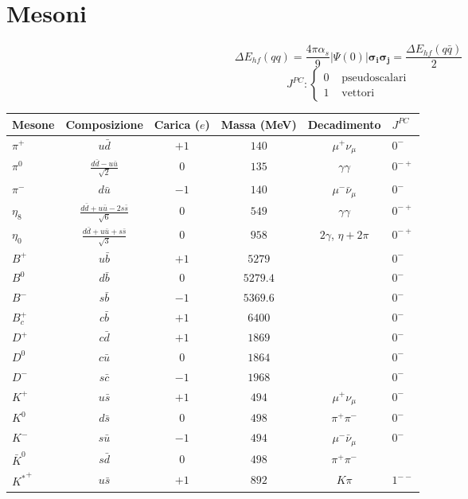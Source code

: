 \documentclass[10pt, onecolumn, a4paper]{article}
\def\bb{\mathbf}
\def\({\left(}
\def\){\right)}
\begin{document}
\section{Mesoni} %
$$\Delta E_{hf}\(qq\)=\frac{4\pi\alpha_s}{9}\left|\Psi\(0\)\right|\bb{\sigma_i}\bb{\sigma_j}=\frac{\Delta E_{hf}\(q\bar q\)}{2}$$
$$J^{PC}:\begin{cases} 0 & \textrm{ pseudoscalari} \\
1 & {\textrm{ vettori}}\end{cases}$$
\begin{center}\begin{tabularx}{\textwidth}{l | c c c c | l}
\toprule
Mesone & Composizione & Carica ($e$) & Massa (\si{MeV}) & Decadimento & $J^{PC}$ \\
\midrule
$\pi^+$ & $u\bar d$ & $+1$ & $140$ & $\mu^+\nu_\mu$ & $0^{-}$ \\
$\pi^0$ & $\frac{d\bar d-u\bar u}{\sqrt{2}}$ & $0$ & $135$ & $\gamma\gamma$ & $0^{-+}$ \\
$\pi^-$ & $d\bar u$ & $-1$ & $140$ & $\mu^-\bar\nu_\mu$ & $0^{-}$ \\
\midrule
$\eta_8$ & $\frac{d\bar d+u\bar u-2s\bar s}{\sqrt{6}}$ & $0$ & $549$ & $\gamma\gamma$ & $0^{-+}$ \\
$\eta_0$ & $\frac{d\bar d+u\bar u+s\bar s}{\sqrt{3}}$ & $0$ & $958$ & $2\gamma$, $\eta+2\pi$ & $0^{-+}$ \\
\midrule
$B^+$ & $u\bar b$ & $+1$ & $5279$ & & $0^{-}$ \\
$B^0$ & $d\bar b$ & $0$ & $5279.4$ & & $0^{-}$ \\
$B^-$ & $s\bar b$ & $-1$ & $5369.6$ & & $0^{-}$ \\
$B^+_c$ & $c\bar b$ & $+1$ & $6400$ & & $0^{-}$ \\
\midrule
$D^+$ & $c\bar d$ & $+1$ & $1869$ & & $0^{-}$ \\
$D^0$ & $c\bar u$ & $0$ & $1864$ & & $0^{-}$ \\
$D^-$ & $s\bar c$ & $-1$ & $1968$ & & $0^{-}$ \\
\midrule
$K^+$ & $u\bar s$ & $+1$ & $494$ & $\mu^+\nu_\mu$ & $0^{-}$ \\
$K^0$ & $d\bar s$ & $0$ & $498$ & $\pi^+\pi^-$ & $0^{-}$ \\
$K^-$ & $s\bar u$ & $-1$ & $494$ & $\mu^-\bar\nu_\mu$ & $0^{-}$ \\
$\bar K^0$ & $s\bar d$ & $0$ & $498$ & $\pi^+\pi^-$ \\
\midrule
\midrule
${K^*}^+$ & $u\bar s$ & $+1$ & $892$ & $K\pi$ & $1^{--}$ \\

\end{tabularx}
\end{center}
\end{document}
